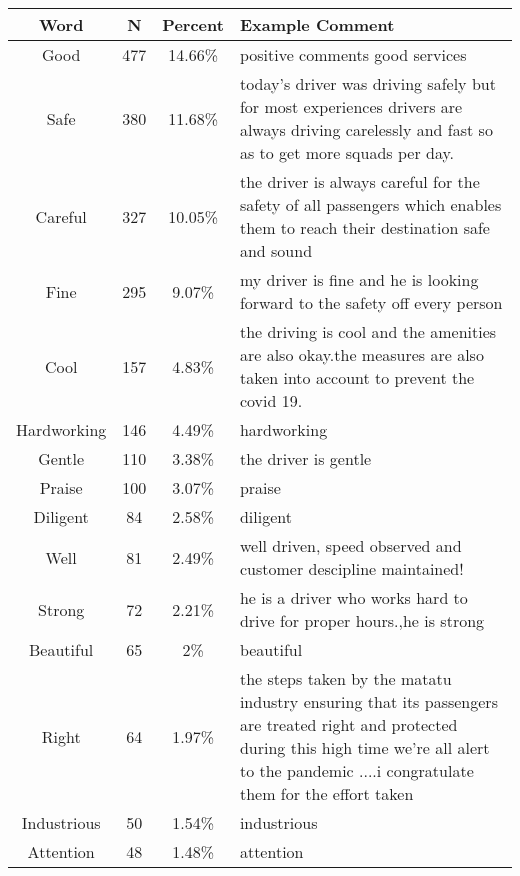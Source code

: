 \begin{tabular}{c|c|c|p{10cm}} \hline 
Word & N & Percent & Example Comment \\ 
\hline 
Good & 477 & 14.66\% & positive comments good services \\ 
 Safe & 380 & 11.68\% & today's driver was driving safely but for most experiences drivers are always driving carelessly and fast so as to get more squads per day. \\ 
 Careful & 327 & 10.05\% & the driver is always careful for the safety of all passengers which enables them to reach their destination safe and sound \\ 
 Fine & 295 & 9.07\% & my driver is fine and he is looking forward to the safety off every person \\ 
 Cool & 157 & 4.83\% & the driving is cool and the amenities are also okay.the measures are also taken into account to prevent the covid 19. \\ 
 Hardworking & 146 & 4.49\% & hardworking \\ 
 Gentle & 110 & 3.38\% & the driver is gentle \\ 
 Praise & 100 & 3.07\% & praise \\ 
 Diligent & 84 & 2.58\% & diligent \\ 
 Well & 81 & 2.49\% & well driven, speed observed and customer descipline maintained! \\ 
 Strong & 72 & 2.21\% & he is a driver who works hard to drive for proper hours.,he is strong \\ 
 Beautiful & 65 & 2\% & beautiful \\ 
 Right & 64 & 1.97\% & the steps taken by the matatu industry ensuring that its passengers are treated right and protected during this high time we're all alert to the pandemic ....i congratulate them for the effort taken \\ 
 Industrious & 50 & 1.54\% & industrious \\ 
 Attention & 48 & 1.48\% & attention \\ 
\hline 
\end{tabular}